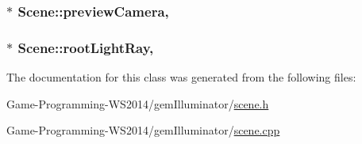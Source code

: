 \subsubsection[{preview\+Camera}]{ $\ast$ Scene\+::preview\+Camera\hspace{0.3cm}{\ttfamily [read]}, {\ttfamily [write]}}\label{class_scene_ae8f457e7e69cac64f533e02f4f13e725}
\hypertarget{class_scene_a437a4ce938a6de368c2a6abba0ec3f3d}{}
\subsubsection[{root\+Light\+Ray}]{ $\ast$ Scene\+::root\+Light\+Ray\hspace{0.3cm}{\ttfamily [read]}, {\ttfamily [write]}}\label{class_scene_a437a4ce938a6de368c2a6abba0ec3f3d}


The documentation for this class was generated from the following files\+:\begin{DoxyCompactItemize}
\item 
Game-\/\+Programming-\/\+W\+S2014/gem\+Illuminator/\hyperlink{scene_8h}{scene.\+h}\item 
Game-\/\+Programming-\/\+W\+S2014/gem\+Illuminator/\hyperlink{scene_8cpp}{scene.\+cpp}\end{DoxyCompactItemize}
